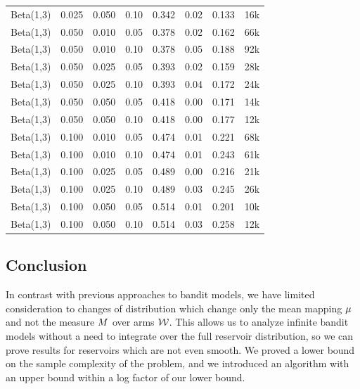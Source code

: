 \begin{table}
\begin{center}
\begin{small}
\begin{sc}
\begin{tabular}{lccc|cccc}
Beta(1,3) & 0.025 & 0.050 & 0.10 & 0.342 & 0.02 & 0.133 & 16k \\
Beta(1,3) & 0.050 & 0.010 & 0.05 & 0.378 & 0.02 & 0.162 & 66k \\
Beta(1,3) & 0.050 & 0.010 & 0.10 & 0.378 & 0.05 & 0.188 & 92k \\
Beta(1,3) & 0.050 & 0.025 & 0.05 & 0.393 & 0.02 & 0.159 & 28k \\
Beta(1,3) & 0.050 & 0.025 & 0.10 & 0.393 & 0.04 & 0.172 & 24k \\
Beta(1,3) & 0.050 & 0.050 & 0.05 & 0.418 & 0.00 & 0.171 & 14k \\
Beta(1,3) & 0.050 & 0.050 & 0.10 & 0.418 & 0.00 & 0.177 & 12k \\
Beta(1,3) & 0.100 & 0.010 & 0.05 & 0.474 & 0.01 & 0.221 & 68k \\
Beta(1,3) & 0.100 & 0.010 & 0.10 & 0.474 & 0.01 & 0.243 & 61k \\
Beta(1,3) & 0.100 & 0.025 & 0.05 & 0.489 & 0.00 & 0.216 & 21k \\
Beta(1,3) & 0.100 & 0.025 & 0.10 & 0.489 & 0.03 & 0.245 & 26k \\
Beta(1,3) & 0.100 & 0.050 & 0.05 & 0.514 & 0.01 & 0.201 & 10k \\
Beta(1,3) & 0.100 & 0.050 & 0.10 & 0.514 & 0.03 & 0.258 & 12k \\
\hline
\end{tabular}
\end{sc}
\end{small}
\end{center}
\vskip -0.1in
\end{table}

\subsection{Conclusion}\label{sec-conclusion}
In contrast with previous approaches to bandit models, we have
limited consideration to changes of distribution which change only the mean mapping 
$\mu$ and not the measure $M$ over arms $\mathcal{W}$.
This allows us to analyze infinite bandit models without a need to integrate
over the full reservoir distribution, so we can prove results for reservoirs
which are not even smooth.
We proved a lower bound on the sample complexity of the problem,
and we introduced an algorithm with an upper bound within a log factor of our
lower bound.

